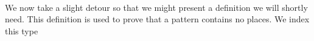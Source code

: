 {\begin{code}
\AgdaSpace{}%
\AgdaSymbol{(}\AgdaSpace{}%
\AgdaSpace{}%
\AgdaSpace{}%
\AgdaSymbol{)}\AgdaSpace{}%
\AgdaSymbol{=}\AgdaSpace{}%
\AgdaSymbol{(}\AgdaSpace{}%
\AgdaSpace{}%
\AgdaSymbol{)}\AgdaSpace{}%
\AgdaSpace{}%
\AgdaSpace{}%
\AgdaSpace{}%
\AgdaSpace{}%
\AgdaOperator{\AgdaInductiveConstructor{[}}\AgdaSpace{}%
\AgdaSpace{}%
\AgdaOperator{\AgdaFunction{++}}\AgdaSpace{}%
\AgdaSpace{}%
\AgdaOperator{\AgdaInductiveConstructor{]}}\<%
\\
\>[0]\AgdaSpace{}%
\AgdaSpace{}%
\AgdaSymbol{(}\AgdaSpace{}%
\AgdaSpace{}%
\AgdaSymbol{)}%
\>[26]\AgdaSymbol{=}\AgdaSpace{}%
\AgdaSymbol{(}\AgdaSpace{}%
\AgdaSpace{}%
\AgdaSymbol{)}\AgdaSpace{}%
\AgdaSpace{}%
\AgdaSymbol{(}\AgdaSpace{}%
\AgdaSpace{}%
\AgdaSymbol{)}\<%
\\
\>[0]\AgdaSpace{}%
\AgdaSpace{}%
\AgdaSymbol{(}\AgdaSpace{}%
\AgdaSymbol{)}%
\>[26]\AgdaSymbol{=}\AgdaSpace{}%
\AgdaSpace{}%
\AgdaSymbol{(}\AgdaSpace{}%
\AgdaSpace{}%
\AgdaSymbol{)}\<%
\\
\>[0]\AgdaSpace{}%
\AgdaSpace{}%
\AgdaSymbol{(}\AgdaSpace{}%
\AgdaSymbol{\{}\AgdaSpace{}%
\AgdaSymbol{=}\AgdaSpace{}%
\AgdaSymbol{\}}\AgdaSpace{}%
\AgdaSpace{}%
\AgdaSymbol{)}\AgdaSpace{}%
\AgdaSymbol{=}\AgdaSpace{}%
\AgdaSymbol{(}\AgdaSpace{}%
\AgdaSpace{}%
\AgdaSymbol{)}\AgdaSpace{}%
\AgdaSpace{}%
\AgdaSpace{}%
\AgdaSpace{}%
\<%
\end{code}
}
We now take a slight detour so that we might present a definition we will shortly need.
This definition is used to prove that a pattern contains no places. We index this type
